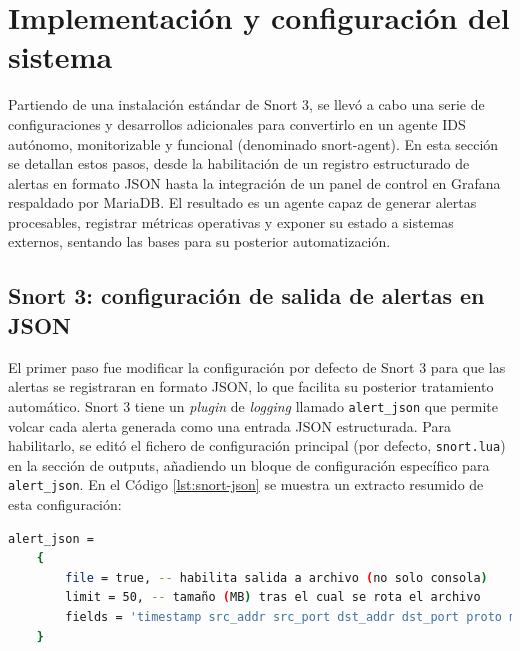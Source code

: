 \documentclass[11pt,a4paper,twoside]{report}
\begin{document}
\newpage

\section{Implementación y configuración del sistema}

Partiendo de una instalación estándar de Snort 3, se llevó a cabo una serie de configuraciones y desarrollos adicionales para convertirlo en un agente IDS autónomo, monitorizable y funcional (denominado snort-agent). En esta sección se detallan estos pasos, desde la habilitación de un registro estructurado de alertas en formato JSON hasta la integración de un panel de control en Grafana respaldado por MariaDB. El resultado es un agente capaz de generar alertas procesables, registrar métricas operativas y exponer su estado a sistemas externos, sentando las bases para su posterior automatización.

\subsection{Snort 3: configuración de salida de alertas en JSON}

El primer paso fue modificar la configuración por defecto de Snort 3 para que las alertas se registraran en formato JSON, lo que facilita su posterior tratamiento automático. Snort 3 tiene un \textit{plugin} de \textit{logging} llamado \texttt{alert\_json} que permite volcar cada alerta generada como una entrada JSON estructurada. Para habilitarlo, se editó el fichero de configuración principal (por defecto, \texttt{snort.lua}) en la sección de outputs, añadiendo un bloque de configuración específico para \texttt{alert\_json}. En el Código \ref{lst:snort-json} se muestra un extracto resumido de esta configuración:

\begin{lstlisting}[language=bash, caption={Configuración de Snort~3 para salida de alertas en JSON}, label={lst:snort-json}]
	alert_json =
	{
		file = true, -- habilita salida a archivo (no solo consola)
		limit = 50, -- tamaño (MB) tras el cual se rota el archivo
		fields = 'timestamp src_addr src_port dst_addr dst_port proto msg sid priority classtype ...'
	}
\end{lstlisting}
\end{document}
